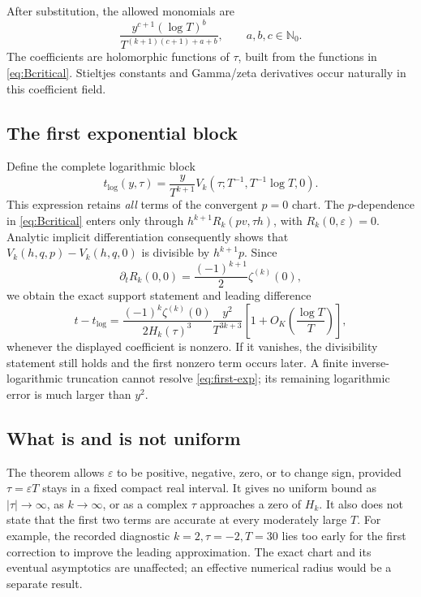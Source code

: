 \documentclass[11pt,a4paper]{article}
\numberwithin{equation}{section}
\theoremstyle{definition}
\theoremstyle{remark}
\newcommand{\Nzero}{\mathbb N_0}
\newcommand{\eps}{\varepsilon}
\begin{document}
After substitution, the allowed monomials are
\begin{equation}
 \frac{y^{c+1}(\log T)^b}
 {T^{(k+1)(c+1)+a+b}},
 \qquad a,b,c\in\Nzero.
 \label{eq:critical-support}
\end{equation}
The coefficients are holomorphic functions of \(\tau\), built from
the functions in \eqref{eq:Bcritical}.  Stieltjes constants and
Gamma/zeta derivatives occur naturally in this coefficient field.

\subsection{The first exponential block}

Define the complete logarithmic block
\[
 t_{\mathrm{log}}(y,\tau)=
 \frac{y}{T^{k+1}}
 V_k\left(\tau;T^{-1},T^{-1}\log T,0\right).
\]
This expression retains \emph{all} terms of the convergent \(p=0\)
chart.  The \(p\)-dependence in \eqref{eq:Bcritical} enters only through
\(h^{k+1}R_k(pv,\tau h)\), with \(R_k(0,\eps)=0\).
Analytic implicit differentiation consequently shows that
\(V_k(h,q,p)-V_k(h,q,0)\) is divisible by \(h^{k+1}p\).
Since
\[
 \partial_tR_k(0,0)=\frac{(-1)^{k+1}}2\zeta^{(k)}(0),
\]
we obtain the exact support statement and leading difference
\begin{equation}
 t-t_{\mathrm{log}}=
 \frac{(-1)^k\zeta^{(k)}(0)}{2H_k(\tau)^3}
 \frac{y^2}{T^{3k+3}}
 \left[1+O_K\left(\frac{\log T}{T}\right)\right],
 \label{eq:first-exp}
\end{equation}
whenever the displayed coefficient is nonzero.
If it vanishes, the divisibility statement still holds and the first
nonzero term occurs later.
A finite inverse-logarithmic truncation cannot resolve
\eqref{eq:first-exp}; its remaining logarithmic error is much larger
than \(y^2\).

\subsection{What is and is not uniform}

The theorem allows \(\eps\) to be positive, negative, zero, or to change
sign, provided \(\tau=\eps T\) stays in a fixed compact real interval.
It gives no uniform bound as \(|\tau|\to\infty\), as \(k\to\infty\), or
as a complex \(\tau\) approaches a zero of \(H_k\).
It also does not state that the first two terms are accurate at every
moderately large \(T\).
For example, the recorded diagnostic \(k=2,\tau=-2,T=30\) lies too early
for the first correction to improve the leading approximation.
The exact chart and its eventual asymptotics are unaffected; an
effective numerical radius would be a separate result.
\end{document}
